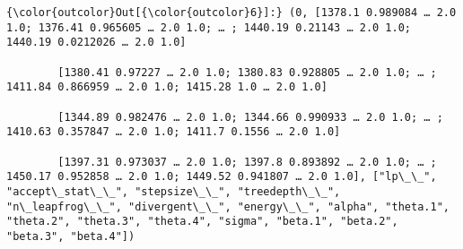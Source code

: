 \documentclass[11pt]{article}
\begin{document}
\begin{Verbatim}[commandchars=\\\{\}]
{\color{outcolor}Out[{\color{outcolor}6}]:} (0, [1378.1 0.989084 … 2.0 1.0; 1376.41 0.965605 … 2.0 1.0; … ; 1440.19 0.21143 … 2.0 1.0; 1440.19 0.0212026 … 2.0 1.0]
        
        [1380.41 0.97227 … 2.0 1.0; 1380.83 0.928805 … 2.0 1.0; … ; 1411.84 0.866959 … 2.0 1.0; 1415.28 1.0 … 2.0 1.0]
        
        [1344.89 0.982476 … 2.0 1.0; 1344.66 0.990933 … 2.0 1.0; … ; 1410.63 0.357847 … 2.0 1.0; 1411.7 0.1556 … 2.0 1.0]
        
        [1397.31 0.973037 … 2.0 1.0; 1397.8 0.893892 … 2.0 1.0; … ; 1450.17 0.952858 … 2.0 1.0; 1449.52 0.941807 … 2.0 1.0], ["lp\_\_", "accept\_stat\_\_", "stepsize\_\_", "treedepth\_\_", "n\_leapfrog\_\_", "divergent\_\_", "energy\_\_", "alpha", "theta.1", "theta.2", "theta.3", "theta.4", "sigma", "beta.1", "beta.2", "beta.3", "beta.4"])
\end{Verbatim}
            

    
    
    
    
\end{document}
